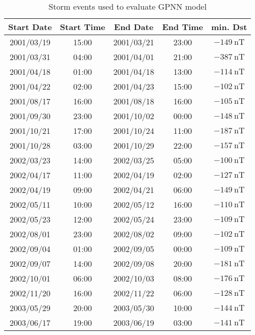\begin{table}[ht]
	\fontsize{8}{9.6}\selectfont
	\centering
	\caption{Storm events used to evaluate GPNN model}
	\label{table:teststormsgpnn}
	\begin{tabular}{ccccc}
	\hline
	Start Date & Start Time & End Date & End Time & min. Dst \\ \hline
	2001/03/19 & 15:00 & 2001/03/21 & 23:00 & $ \SI{-149}{\nano\tesla}$ \\
	2001/03/31 & 04:00 & 2001/04/01 & 21:00 & $ \SI{-387}{\nano\tesla}$ \\
	2001/04/18 & 01:00 & 2001/04/18 & 13:00 & $ \SI{-114}{\nano\tesla}$ \\
	2001/04/22 & 02:00 & 2001/04/23 & 15:00 & $ \SI{-102}{\nano\tesla}$ \\
	2001/08/17 & 16:00 & 2001/08/18 & 16:00 & $ \SI{-105}{\nano\tesla}$ \\
	2001/09/30 & 23:00 & 2001/10/02 & 00:00 & $ \SI{-148}{\nano\tesla}$ \\
	2001/10/21 & 17:00 & 2001/10/24 & 11:00 & $ \SI{-187}{\nano\tesla}$ \\
	2001/10/28 & 03:00 & 2001/10/29 & 22:00 & $ \SI{-157}{\nano\tesla}$ \\
	2002/03/23 & 14:00 & 2002/03/25 & 05:00 & $ \SI{-100}{\nano\tesla}$ \\
	2002/04/17 & 11:00 & 2002/04/19 & 02:00 & $ \SI{-127}{\nano\tesla}$ \\
	2002/04/19 & 09:00 & 2002/04/21 & 06:00 & $ \SI{-149}{\nano\tesla}$ \\
	2002/05/11 & 10:00 & 2002/05/12 & 16:00 & $ \SI{-110}{\nano\tesla}$ \\
	2002/05/23 & 12:00 & 2002/05/24 & 23:00 & $ \SI{-109}{\nano\tesla}$ \\
	2002/08/01 & 23:00 & 2002/08/02 & 09:00 & $ \SI{-102}{\nano\tesla}$ \\
	2002/09/04 & 01:00 & 2002/09/05 & 00:00 & $ \SI{-109}{\nano\tesla}$ \\
	2002/09/07 & 14:00 & 2002/09/08 & 20:00 & $ \SI{-181}{\nano\tesla}$ \\
	2002/10/01 & 06:00 & 2002/10/03 & 08:00 & $ \SI{-176}{\nano\tesla}$ \\
	2002/11/20 & 16:00 & 2002/11/22 & 06:00 & $ \SI{-128}{\nano\tesla}$ \\
	2003/05/29 & 20:00 & 2003/05/30 & 10:00 & $ \SI{-144}{\nano\tesla}$ \\
	2003/06/17 & 19:00 & 2003/06/19 & 03:00 & $ \SI{-141}{\nano\tesla}$ \\

\end{tabular}
\end{table}

